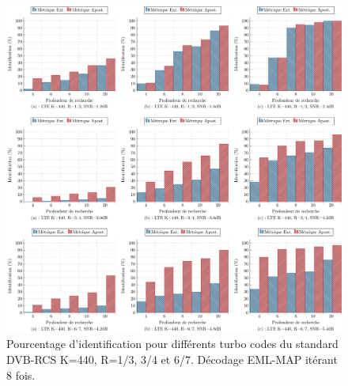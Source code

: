 \begin{figure}[!h]
	\centering
	\hspace*{-1cm}
	\includegraphics[width=1.05\textwidth]{main/ch3_fig/id2/dvb/tikz/440.pdf}
	\caption{Pourcentage d'identification pour différents turbo codes du standard DVB-RCS K=440, R=1/3, 3/4 et 6/7.
	Décodage EML-MAP itérant 8 fois. \label{fig:dvb752}}
\end{figure}